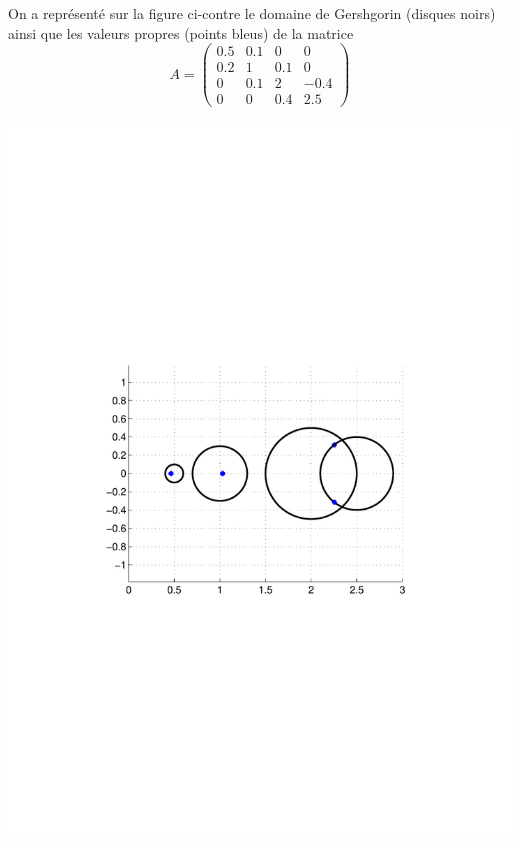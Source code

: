 \begin{minipage}{0.45\columnwidth}
On a représenté sur la figure ci-contre le domaine de Gershgorin (disques
noirs) ainsi que les valeurs propres (points bleus) de la matrice
\[
A = \left(\begin{array}{cccc}
0.5 & 0.1 & 0 & 0\\
0.2 & 1 & 0.1 & 0\\
0 & 0.1& 2 & -0.4 \\
0 & 0 & 0.4 & 2.5
\end{array}\right)
\]
\end{minipage}
\hspace{0.05 \columnwidth}
\begin{minipage}{0.45\columnwidth}
\includegraphics[width = \columnwidth]{gersh.pdf}
\end{minipage}

